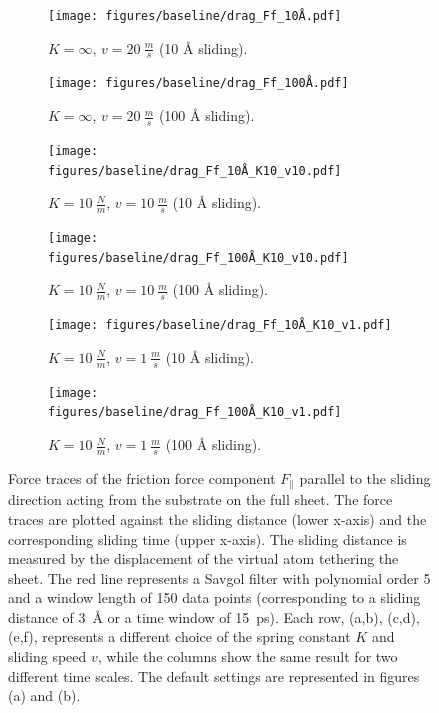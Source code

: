 \begin{figure}[H]
  \centering
  \begin{subfigure}[t]{0.49\textwidth}
      \centering
      \texttt{[image: figures/baseline/drag\_Ff\_10Å.pdf]}
      \caption{$K = \infty$, $v = \SI{20}{\frac{m}{s}}$ (10 Å sliding).}
      \label{fig:drag_Ff_10}
  \end{subfigure}
  \hfill
  \begin{subfigure}[t]{0.49\textwidth}
      \centering
      \texttt{[image: figures/baseline/drag\_Ff\_100Å.pdf]}
      \caption{$K = \infty$, $v = \SI{20}{\frac{m}{s}}$ (100 Å sliding).}
      \label{fig:drag_Ff_100}
    \end{subfigure}
    \hfill
    \begin{subfigure}[t]{0.49\textwidth}
      \centering
      \texttt{[image: figures/baseline/drag\_Ff\_10Å\_K10\_v10.pdf]}
      \caption{$K = \SI{10}{\frac{N}{m}}$, $v = \SI{10}{\frac{m}{s}}$ (10 Å sliding).}
      \label{fig:drag_Ff_10_K10_v10}
    \end{subfigure}
    \hfill
    \begin{subfigure}[t]{0.49\textwidth}
      \centering
      \texttt{[image: figures/baseline/drag\_Ff\_100Å\_K10\_v10.pdf]}
      \caption{$K = \SI{10}{\frac{N}{m}}$, $v = \SI{10}{\frac{m}{s}}$ (100 Å sliding).}
      \label{fig:drag_Ff_100_K10_v10}
  \end{subfigure}
  \hfill
    \begin{subfigure}[t]{0.49\textwidth}
      \centering
      \texttt{[image: figures/baseline/drag\_Ff\_10Å\_K10\_v1.pdf]}
      \caption{$K = \SI{10}{\frac{N}{m}}$, $v = \SI{1}{\frac{m}{s}}$ (10 Å sliding).}
      \label{fig:drag_Ff_10_K10_v1}
    \end{subfigure}
    \hfill
    \begin{subfigure}[t]{0.49\textwidth}
      \centering
      \texttt{[image: figures/baseline/drag\_Ff\_100Å\_K10\_v1.pdf]}
      \caption{$K = \SI{10}{\frac{N}{m}}$, $v = \SI{1}{\frac{m}{s}}$ (100 Å sliding).}
      \label{fig:drag_Ff_100_K10_v1}
  \end{subfigure}
  \hfill
     \caption{Force traces of the friction force component $F_\parallel$ parallel to the sliding direction acting from the substrate on the full sheet. The force traces are plotted against the sliding distance (lower x-axis) and the corresponding sliding time (upper x-axis). The sliding distance is measured by the displacement of the virtual atom tethering the sheet. The red line represents a Savgol filter with polynomial order 5 and a window length of 150 data points (corresponding to a sliding distance of \SI{3}{Å} or a time window of \SI{15}{ps}). Each row, (a,b), (c,d), (e,f), represents a different choice of the spring constant $K$ and sliding speed $v$, while the columns show the same result for two different time scales. The default settings are represented in figures (a) and (b).}
     \label{fig:drag_Ff}
\end{figure}
\pagebreak

